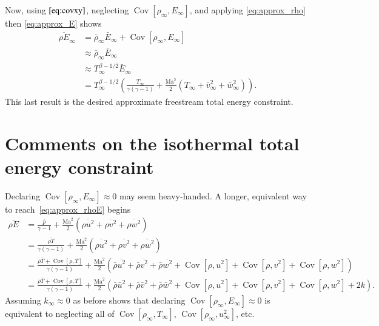 \documentclass[letterpaper,11pt,nointlimits,reqno]{amsart}
\newcommand{\Mach}[1][]{\mbox{Ma}_{#1}}
\newcommand{\Cov}[2]{\ensuremath{\operatorname{Cov}\left[{#1},{#2}\right]}}
\begin{document}
Now, using $\eqref{eq:covxy}$, neglecting $\Cov{\rho_\infty}{E_\infty}$, and
applying \eqref{eq:approx_rho} then \eqref{eq:approx_E} shows
\begin{align}
  \overline{\rho E}_\infty
  &=
  \bar{\rho}_\infty \bar{E}_\infty + \Cov{\rho_\infty}{E_\infty}
\\
  &\approx \bar{\rho}_\infty \bar{E}_\infty
\\
  &\approx T_\infty^{\beta-1/2} \bar{E}_\infty
\\
  \label{eq:approx_rhoE}
  &=
  T_\infty^{\beta-1/2} \left(
      \frac{T_\infty}{\gamma\left( \gamma-1 \right)}
    + \frac{\Mach^2}{2}\left(T_\infty+\bar{v}^2_\infty+\bar{w}^2_\infty\right)
  \right)
.
\end{align}
This last result is the desired approximate freestream total energy constraint.

\section{Comments on the isothermal total energy constraint}

Declaring $\Cov{\rho_\infty}{E_\infty} \approx 0$ may seem heavy-handed.  A
longer, equivalent way to reach~\eqref{eq:approx_rhoE} begins
\begin{align}
  \overline{\rho E}
&=
    \frac{\bar{p}}{\gamma-1}
  + \frac{\Mach^2}{2}\left(
        \overline{\rho u^2}
      + \overline{\rho v^2}
      + \overline{\rho w^2}
    \right)
\\
&=
    \frac{\overline{\rho T}}{\gamma\left(\gamma-1\right)}
  + \frac{\Mach^2}{2}\left(
        \overline{\rho u^2}
      + \overline{\rho v^2}
      + \overline{\rho w^2}
    \right)
\\
&=
    \frac{\bar{\rho}\bar{T} + \Cov{\rho}{T}}
         {\gamma\left(\gamma-1\right)}
  + \frac{\Mach^2}{2}\left(
        \bar{\rho} \overline{u^2}
      + \bar{\rho} \overline{v^2}
      + \bar{\rho} \overline{w^2}
      + \Cov{\rho}{u^2}
      + \Cov{\rho}{v^2}
      + \Cov{\rho}{w^2}
    \right)
\\
&=
    \frac{\bar{\rho}\bar{T} + \Cov{\rho}{T}}
         {\gamma\left(\gamma-1\right)}
  + \frac{\Mach^2}{2}\left(
        \bar{\rho} \bar{u}^2
      + \bar{\rho} \bar{v}^2
      + \bar{\rho} \bar{w}^2
      + \Cov{\rho}{u^2}
      + \Cov{\rho}{v^2}
      + \Cov{\rho}{w^2}
      + 2 k
    \right)
.
\end{align}
Assuming $k_\infty \approx 0$ as before shows that declaring
$\Cov{\rho_\infty}{E_\infty} \approx 0$ is equivalent to neglecting all of
$\Cov{\rho_\infty}{T_\infty}$, $\Cov{\rho_\infty}{u^2_\infty}$, etc.
\end{document}
